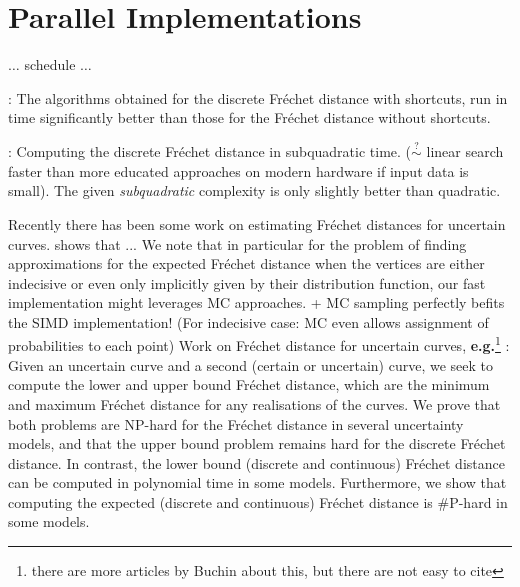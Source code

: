 \section{Parallel Implementations}
\label{sec:parallel}
$\ldots$ schedule $\ldots$

\citep{avraham14}: The algorithms obtained for the discrete Fr\'echet distance with
shortcuts, run in time significantly better than those for the Fr\'echet
distance without shortcuts. 

\citep{agarwal14}: Computing the discrete Fr\'echet distance in subquadratic time. ($\overset{?}{\sim}$ linear search faster than more educated approaches on modern hardware if input data is small). The given \textit{subquadratic} complexity is only slightly better than quadratic.


Recently there has been some work on estimating Fr\'echet distances for uncertain curves. \citet{buchin23} shows that ... We note that in particular for the problem of finding approximations for the expected Fr\'echet distance when the vertices are either indecisive or even only implicitly given by their distribution function, our fast implementation might leverages MC approaches. + MC sampling perfectly befits the SIMD implementation! (For indecisive case: MC even allows assignment of probabilities to each point)
Work on Fr\'echet distance for uncertain curves, \textbf{e.g.}\footnote{there are more articles by Buchin about this, but there are not easy to cite} \citep{buchin23}: Given an uncertain curve and a second (certain or uncertain) curve, we seek to compute the lower and upper bound Fr\'echet distance, which are the minimum and maximum Fr\'echet distance for any realisations of the curves.
We prove that both problems are NP-hard for the Fr\'echet distance in several uncertainty models, and that the upper bound problem remains hard for the discrete Fr\'echet distance.
In contrast, the lower bound (discrete and continuous) Fr\'echet distance can be computed in polynomial time in some models.
Furthermore, we show that computing the expected (discrete and continuous) Fr\'echet distance is \#P-hard in some models.

